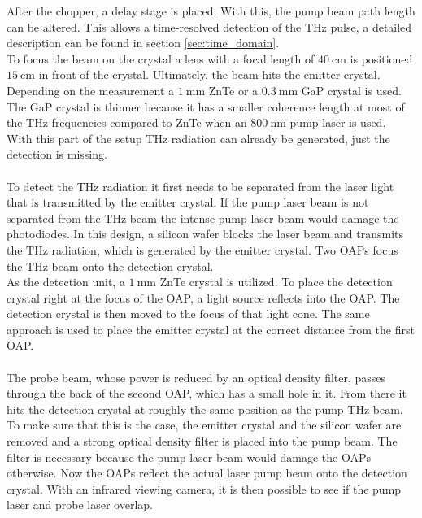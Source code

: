 After the chopper, a delay stage is placed.
With this, the pump beam path length can be altered.
This allows a time-resolved detection of the $\si{\tera\hertz}$ pulse, a detailed description can be found in section \ref{sec:time_domain}.
\\
To focus the beam on the crystal a lens with a focal length of $\SI{40}{\centi\meter}$ is positioned $\SI{15}{\centi\meter}$ in front of the crystal.
Ultimately, the beam hits the emitter crystal.
Depending on the measurement a $\SI{1}{\milli\meter}$ ZnTe or a $\SI{0.3}{\milli\meter}$ GaP crystal is used.
The GaP crystal is thinner because it has a smaller coherence length at most of the $\si{\tera\hertz}$ frequencies compared to ZnTe when an $\SI{800}{\nano\meter}$ pump laser is used.
\\
With this part of the setup $\si{\tera\hertz}$ radiation can already be generated, just the detection is missing.
\\\\
To detect the $\si{\tera\hertz}$ radiation it first needs to be separated from the laser light that is transmitted by the emitter crystal.
If the pump laser beam is not separated from the $\si{\tera\hertz}$ beam the intense pump laser beam would damage the photodiodes.
In this design, a silicon wafer blocks the laser beam and transmits the $\si{\tera\hertz}$ radiation, which is generated by the emitter crystal.
Two OAPs focus the $\si{\tera\hertz}$ beam onto the detection crystal.
\\
As the detection unit, a $\SI{1}{\milli\meter}$ ZnTe crystal is utilized.
To place the detection crystal right at the focus of the OAP, a light source reflects into the OAP.
The detection crystal is then moved to the focus of that light cone.
The same approach is used to place the emitter crystal at the correct distance from the first OAP.
\\\\
The probe beam, whose power is reduced by an optical density filter, passes through the back of the second OAP, which has a small hole in it.
From there it hits the detection crystal at roughly the same position as the pump $\si{\tera\hertz}$ beam.
\\
To make sure that this is the case, the emitter crystal and the silicon wafer are removed and a strong optical density filter is placed into the pump beam.
The filter is necessary because the pump laser beam would damage the OAPs otherwise.
Now the OAPs reflect the actual laser pump beam onto the detection crystal.
With an infrared viewing camera, it is then possible to see if the pump laser and probe laser overlap.
